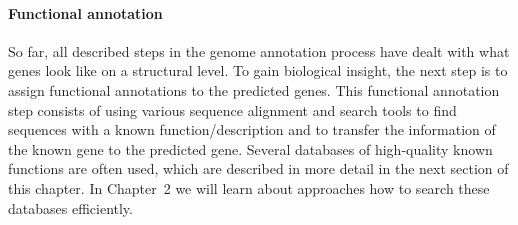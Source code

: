 \paragraph{Functional annotation}\label{chapter1_functional_annotation}

So far, all described steps in the genome annotation process have dealt with what genes look like on a structural level.
To gain biological insight, the next step is to assign functional annotations to the predicted genes.
This functional annotation step consists of using various sequence alignment and search tools to find sequences with a known function/description and to transfer the information of the known gene to the predicted gene.
Several databases of high-quality known functions are often used, which are described in more detail in the next section of this chapter.
In Chapter~2 we will learn about approaches how to search these databases efficiently.

